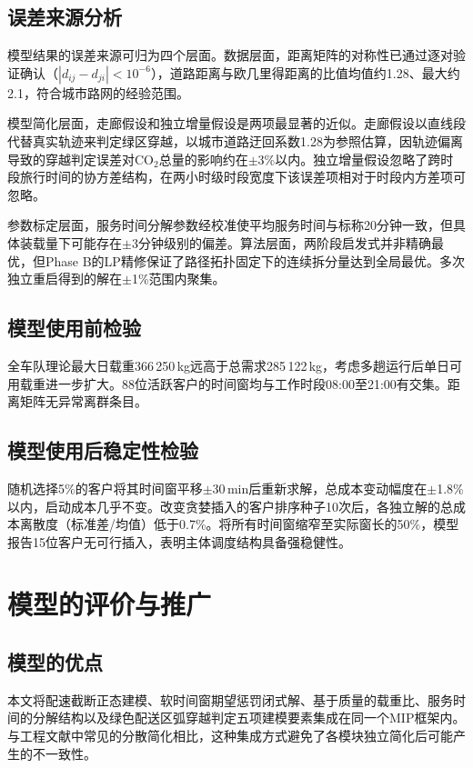 \documentclass[12pt,a4paper]{article}
\begin{document}
\subsection{误差来源分析}

模型结果的误差来源可归为四个层面。数据层面，距离矩阵的对称性已通过逐对验证确认（$|d_{ij}-d_{ji}|<10^{-6}$），道路距离与欧几里得距离的比值均值约1.28、最大约2.1，符合城市路网的经验范围。

模型简化层面，走廊假设和独立增量假设是两项最显著的近似。走廊假设以直线段代替真实轨迹来判定绿区穿越，以城市道路迂回系数1.28为参照估算，因轨迹偏离导致的穿越判定误差对CO$_2$总量的影响约在$\pm$3\%以内。独立增量假设忽略了跨时段旅行时间的协方差结构，在两小时级时段宽度下该误差项相对于时段内方差项可忽略。

参数标定层面，服务时间分解参数经校准使平均服务时间与标称20分钟一致，但具体装载量下可能存在$\pm$3分钟级别的偏差。算法层面，两阶段启发式并非精确最优，但Phase B的LP精修保证了路径拓扑固定下的连续拆分量达到全局最优。多次独立重启得到的解在$\pm$1\%范围内聚集。

\subsection{模型使用前检验}

全车队理论最大日载重366\,250\,kg远高于总需求285\,122\,kg，考虑多趟运行后单日可用载重进一步扩大。88位活跃客户的时间窗均与工作时段08:00至21:00有交集。距离矩阵无异常离群条目。
\subsection{模型使用后稳定性检验}

随机选择5\%的客户将其时间窗平移$\pm$30\,min后重新求解，总成本变动幅度在$\pm$1.8\%以内，启动成本几乎不变。改变贪婪插入的客户排序种子10次后，各独立解的总成本离散度（标准差/均值）低于0.7\%。将所有时间窗缩窄至实际窗长的50\%，模型报告15位客户无可行插入，表明主体调度结构具备强稳健性。

\section{模型的评价与推广}

\subsection{模型的优点}

本文将配速截断正态建模、软时间窗期望惩罚闭式解、基于质量的载重比、服务时间的分解结构以及绿色配送区弧穿越判定五项建模要素集成在同一个MIP框架内。与工程文献中常见的分散简化相比，这种集成方式避免了各模块独立简化后可能产生的不一致性。
\end{document}
